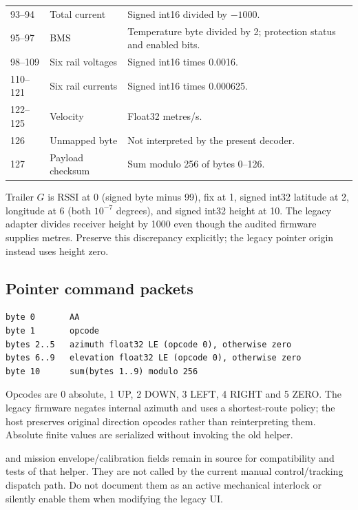 \begin{longtable}{@{}L{.14\linewidth}L{.31\linewidth}L{.48\linewidth}@{}}
93--94 & Total current & Signed int16 divided by $-1000$. \\
95--97 & BMS & Temperature byte divided by 2; protection status and enabled bits. \\
98--109 & Six rail voltages & Signed int16 times 0.0016. \\
110--121 & Six rail currents & Signed int16 times 0.000625. \\
122--125 & Velocity & Float32 metres/s. \\
126 & Unmapped byte & Not interpreted by the present decoder. \\
127 & Payload checksum & Sum modulo 256 of bytes 0--126. \\
\bottomrule
\end{longtable}
Trailer \(G\) is RSSI at 0 (signed byte minus 99), fix at 1, signed int32
latitude at 2, longitude at 6 (both \(10^{-7}\) degrees), and signed int32
height at 10. The legacy adapter divides receiver height by 1000 even though the
audited firmware supplies metres. Preserve this discrepancy explicitly; the
legacy pointer origin instead uses height zero.

\subsection{Pointer command packets}
\begin{lstlisting}
byte 0       AA
byte 1       opcode
bytes 2..5   azimuth float32 LE (opcode 0), otherwise zero
bytes 6..9   elevation float32 LE (opcode 0), otherwise zero
byte 10      sum(bytes 1..9) modulo 256
\end{lstlisting}
Opcodes are 0 absolute, 1 UP, 2 DOWN, 3 LEFT, 4 RIGHT and 5 ZERO.
The legacy firmware negates internal azimuth and uses a shortest-route policy;
the host preserves original direction opcodes rather than reinterpreting them.
Absolute finite values are serialized without invoking the old
 helper.

 and mission envelope/calibration fields remain in source
for compatibility and tests of that helper. They are not called by the current
manual control/tracking dispatch path. Do not document them as an active
mechanical interlock or silently enable them when modifying the legacy UI.

